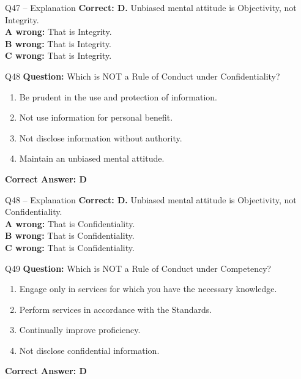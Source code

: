 \documentclass[aspectratio=169,10pt]{beamer}
\begin{document}
	\begin{frame}[t]{Q47 -- Explanation}
		\small
		\textbf{Correct: D.} Unbiased mental attitude is Objectivity, not Integrity. \\[4pt]
		\textbf{A wrong:} That is Integrity. \\[2pt]
		\textbf{B wrong:} That is Integrity. \\[2pt]
		\textbf{C wrong:} That is Integrity.
	\end{frame}
	
	\begin{frame}[t]{Q48}
		\small
		\textbf{Question:} Which is NOT a Rule of Conduct under Confidentiality?
		\begin{enumerate}[label=\Alph*.,itemsep=1pt,topsep=2pt]
			\item Be prudent in the use and protection of information.
			\item Not use information for personal benefit.
			\item Not disclose information without authority.
			\item Maintain an unbiased mental attitude.
		\end{enumerate}
		\vspace{4pt}
		\textbf{Correct Answer: D}
	\end{frame}
	
	\begin{frame}[t]{Q48 -- Explanation}
		\small
		\textbf{Correct: D.} Unbiased mental attitude is Objectivity, not Confidentiality. \\[4pt]
		\textbf{A wrong:} That is Confidentiality. \\[2pt]
		\textbf{B wrong:} That is Confidentiality. \\[2pt]
		\textbf{C wrong:} That is Confidentiality.
	\end{frame}
	
	\begin{frame}[t]{Q49}
		\small
		\textbf{Question:} Which is NOT a Rule of Conduct under Competency?
		\begin{enumerate}[label=\Alph*.,itemsep=1pt,topsep=2pt]
			\item Engage only in services for which you have the necessary knowledge.
			\item Perform services in accordance with the Standards.
			\item Continually improve proficiency.
			\item Not disclose confidential information.
		\end{enumerate}
		\vspace{4pt}
		\textbf{Correct Answer: D}
	\end{frame}
	
\end{document}
